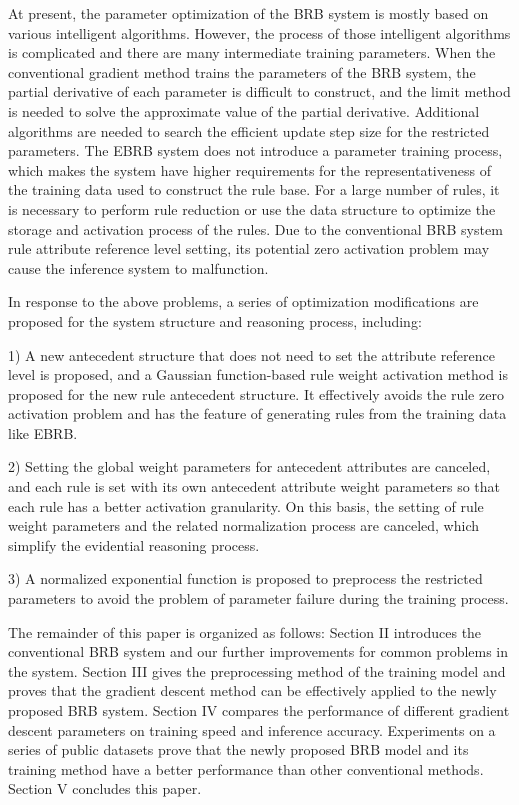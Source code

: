 \documentclass{ieeeaccess}
\begin{document}
At present, the parameter optimization of the BRB system is mostly based on various intelligent algorithms.
However, the process of those intelligent algorithms is complicated and there are many intermediate training parameters.
When the conventional gradient method trains the parameters of the BRB system, the partial derivative of each parameter is difficult to construct,
and the limit method is needed to solve the approximate value of the partial derivative\cite{a13}.
Additional algorithms are needed to search the efficient update step size for the restricted parameters\cite{a11,a12,a13}.
The EBRB system does not introduce a parameter training process, which makes the system have higher requirements for the representativeness of the training data used to construct the rule base.
For a large number of rules, it is necessary to perform rule reduction or use the data structure to optimize the storage and activation process of the rules.
Due to the conventional BRB system rule attribute reference level setting, its potential zero activation problem may cause the inference system to malfunction.

In response to the above problems, a series of optimization modifications are proposed for the system structure and reasoning process, including:

1) A new antecedent structure that does not need to set the attribute reference level is proposed, and a Gaussian function-based
rule weight activation method is proposed for the new rule antecedent structure. It effectively avoids the rule zero activation problem and has the feature of
generating rules from the training data like EBRB.

2) Setting the global weight parameters for antecedent attributes are canceled,
and each rule is set with its own antecedent attribute weight parameters so that each rule has a better activation granularity.
On this basis, the setting of rule weight parameters and the related normalization process are canceled,
which simplify the evidential reasoning process.

3) A normalized exponential function is proposed to preprocess the restricted parameters to
avoid the problem of parameter failure during the training process.

The remainder of this paper is organized as follows: Section II introduces the conventional BRB system and our further improvements for common problems in the system.
Section III gives the preprocessing method of the training model and proves that the gradient descent method can be effectively applied to the newly proposed BRB system.
Section IV compares the performance of different gradient descent parameters on training speed and inference accuracy. Experiments on a series of public datasets prove that
the newly proposed BRB model and its training method have a better performance than other conventional methods. Section V concludes this paper.
\end{document}
